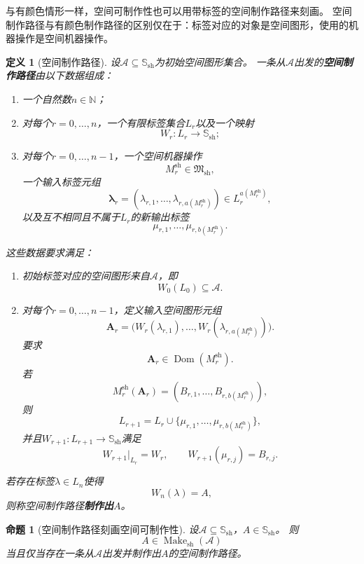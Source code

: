 \documentclass[UTF8,fontset=none]{ctexart}
\theoremstyle{cnthm}
\newtheorem{definition}{定义}[section]
\newtheorem{proposition}{命题}[section]
\begin{document}
			与有颜色情形一样，空间可制作性也可以用带标签的空间制作路径来刻画。
			空间制作路径与有颜色制作路径的区别仅在于：标签对应的对象是空间图形，使用的机器操作是空间机器操作。
			
			\begin{definition}[空间制作路径]
				设$\mathcal{A}\subseteq\mathbb{S}_{\mathrm{sh}}$为初始空间图形集合。
				一条从$\mathcal{A}$出发的\textbf{空间制作路径}由以下数据组成：
				\begin{enumerate}
					\item 一个自然数$n\in\mathbb{N}$；
					\item 对每个$r=0,\dots,n$，一个有限标签集合$L_r$以及一个映射
					$$
					W_r:L_r\to\mathbb{S}_{\mathrm{sh}};
					$$
					\item 对每个$r=0,\dots,n-1$，一个空间机器操作
					$$
					M_r^{\mathrm{sh}}\in\mathfrak{M}_{\mathrm{sh}},
					$$
					一个输入标签元组
					$$
					\boldsymbol{\lambda}_r
					=
					(\lambda_{r,1},\dots,\lambda_{r,a(M_r^{\mathrm{sh}})})
					\in L_r^{a(M_r^{\mathrm{sh}})},
					$$
					以及互不相同且不属于$L_r$的新输出标签
					$$
					\mu_{r,1},\dots,\mu_{r,b(M_r^{\mathrm{sh}})}.
					$$
				\end{enumerate}
				这些数据要求满足：
				\begin{enumerate}
					\item 初始标签对应的空间图形来自$\mathcal{A}$，即
					$$
					W_0(L_0)\subseteq\mathcal{A}.
					$$
					
					\item 对每个$r=0,\dots,n-1$，定义输入空间图形元组
					$$
					\mathbf{A}_r
					=
					\bigl(
					W_r(\lambda_{r,1}),\dots,W_r(\lambda_{r,a(M_r^{\mathrm{sh}})})
					\bigr).
					$$
					要求
					$$
					\mathbf{A}_r\in\operatorname{Dom}(M_r^{\mathrm{sh}}).
					$$
					若
					$$
					M_r^{\mathrm{sh}}(\mathbf{A}_r)
					=
					(B_{r,1},\dots,B_{r,b(M_r^{\mathrm{sh}})}),
					$$
					则
					$$
					L_{r+1}
					=
					L_r\cup\{\mu_{r,1},\dots,\mu_{r,b(M_r^{\mathrm{sh}})}\},
					$$
					并且$W_{r+1}:L_{r+1}\to\mathbb{S}_{\mathrm{sh}}$满足
					$$
					W_{r+1}|_{L_r}=W_r,
					\qquad
					W_{r+1}(\mu_{r,j})=B_{r,j}.
					$$
				\end{enumerate}
				
				若存在标签$\lambda\in L_n$使得
				$$
				W_n(\lambda)=A,
				$$
				则称空间制作路径\textbf{制作出}$A$。
			\end{definition}
			
			\begin{proposition}[空间制作路径刻画空间可制作性]\label{prop:shape-make-path-characterization}
				设$\mathcal{A}\subseteq\mathbb{S}_{\mathrm{sh}}$，$A\in\mathbb{S}_{\mathrm{sh}}$。
				则
				$$
				A\in\operatorname{Make}_{\mathrm{sh}}(\mathcal{A})
				$$
				当且仅当存在一条从$\mathcal{A}$出发并制作出$A$的空间制作路径。
			\end{proposition}
			
\end{document}
